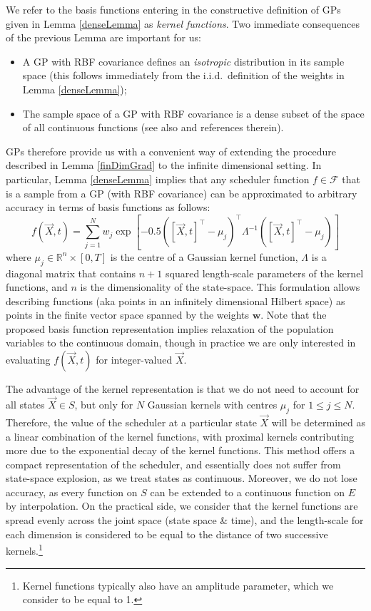 We refer to the basis functions entering in the constructive definition of GPs given in Lemma \ref{denseLemma} as {\it kernel functions}. Two immediate consequences of the previous Lemma are important for us:\begin{itemize}
\item{A GP with RBF covariance defines an {\it isotropic} distribution in its sample space (this follows immediately from the i.i.d.\ definition of the weights in Lemma \ref{denseLemma})};
\item{The sample space of a GP with RBF covariance is a dense subset of the space of all continuous functions (see also \cite{bortolussi:smoothed16} and references therein).}
\end{itemize}





GPs therefore provide us with a convenient way of extending the procedure described in Lemma \ref{finDimGrad} to the infinite dimensional setting.
In particular, Lemma \ref{denseLemma} implies that any scheduler function $f \in \mathcal{F}$ that is a sample from a GP (with RBF covariance) can be approximated to arbitrary accuracy in terms of basis functions as follows:
\begin{equation}
f(\vec{X}, t) = \sum_{j=1}^N w_j \exp\left[-0.5 ([\vec{X},t]^{\top}-\mu_j)^{\top} \Lambda^{-1} ([\vec{X},t]^{\top}-\mu_j) \right]
\end{equation}
where $\mu_j \in \mathbb{R}^n \times [0,T]$ is the centre of a Gaussian kernel function, $\Lambda$ is a diagonal matrix that contains $n+1$ squared length-scale parameters of the kernel functions, and $n$ is the dimensionality of the state-space.
This formulation allows describing functions (aka points in an infinitely dimensional Hilbert space) as points in the finite vector space spanned by the weights $\mathbf{w}$.
Note that the proposed basis function representation implies relaxation of the population variables to the continuous domain, though in  practice we are only interested in evaluating $f(\vec{X}, t)$ for integer-valued $\vec{X}$. 

The advantage of the kernel representation is that we do not need to account for all states $\vec{X} \in S$, but only for $N$ Gaussian kernels with centres $\mu_j$ for $1 \leq j \leq N$.
Therefore, the value of the scheduler at a particular state $\vec{X}$ will be determined as a linear combination of the kernel functions, with proximal kernels contributing more due to the exponential decay of the kernel functions.
This method offers a compact representation of the scheduler, and essentially does not suffer from state-space explosion, as we treat states as continuous. Moreover, we do not lose accuracy, as every function on $S$ can be extended to a continuous function on $E$ by interpolation.
On the practical side, we consider that the kernel functions are spread evenly across the joint space (state space \& time), and the length-scale for each dimension is considered to be equal to the distance of two successive kernels.\footnote{Kernel functions typically also have an amplitude parameter, which we consider to be equal to 1.}




